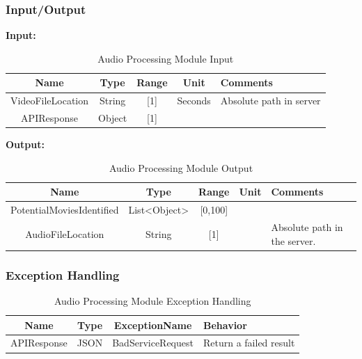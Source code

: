 \documentclass{article}
\begin{document}
\subsubsection{Input/Output}
\textbf{Input:}
\begin{table}[H]
    \caption{Audio Processing Module Input}
    \centering
    \begin{tabularx}{0.7\textwidth}{|c|c|c|c|X|} \hline
        \textbf{Name} & \textbf{Type} & \textbf{Range} & \textbf{Unit} & \textbf{Comments} \\ \hline
        VideoFileLocation & String & [1] & Seconds & Absolute path in server \\ \hline
        APIResponse & Object & [1] & & \\ \hline
    \end{tabularx}
    \label{tab:Audio_Processing_Input}
\end{table}

\textbf{Output:}
\begin{table}[H]
    \caption{Audio Processing Module Output}
    \centering
    \begin{tabularx}{0.7\textwidth}{|c|c|c|c|X|} \hline
        \textbf{Name} & \textbf{Type} & \textbf{Range} & \textbf{Unit} & \textbf{Comments} \\ \hline
        PotentialMoviesIdentified & List<Object> & [0,100] & &\\ \hline
        AudioFileLocation & String & [1] & & Absolute path in the server. \\ \hline
    \end{tabularx}
    \label{tab:Audio_Processing_Output}
\end{table}

\subsubsection{Exception Handling}
\begin{table}[H]
    \caption{Audio Processing Module Exception Handling}
    \centering
    \begin{tabularx}{0.7\textwidth}{|c|c|c|X|} \hline
        \textbf{Name} & \textbf{Type} & \textbf{ExceptionName} & \textbf{Behavior} \\ \hline
        APIResponse & JSON & BadServiceRequest & Return a failed result \\ \hline
    \end{tabularx}
    \label{tab:Audio_Processing_Exception}
\end{table}
\end{document}
